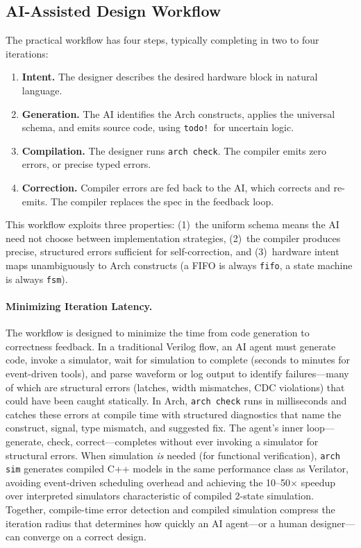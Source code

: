 \documentclass[11pt,twocolumn]{article}
\begin{document}
\subsection{AI-Assisted Design Workflow}

The practical workflow has four steps, typically completing in two to four iterations:

\begin{enumerate}
\item \textbf{Intent.} The designer describes the desired hardware block in natural language.
\item \textbf{Generation.} The AI identifies the Arch constructs, applies the universal schema, and emits source code, using \texttt{todo!}\ for uncertain logic.
\item \textbf{Compilation.} The designer runs \texttt{arch check}. The compiler emits zero errors, or precise typed errors.
\item \textbf{Correction.} Compiler errors are fed back to the AI, which corrects and re-emits. The compiler replaces the spec in the feedback loop.
\end{enumerate}

This workflow exploits three properties: (1)~the uniform schema means the AI need not choose between implementation strategies, (2)~the compiler produces precise, structured errors sufficient for self-correction, and (3)~hardware intent maps unambiguously to Arch constructs (a FIFO is always \texttt{fifo}, a state machine is always \texttt{fsm}).

\paragraph{Minimizing Iteration Latency.}
The workflow is designed to minimize the time from code generation to correctness feedback. In a traditional Verilog flow, an AI agent must generate code, invoke a simulator, wait for simulation to complete (seconds to minutes for event-driven tools), and parse waveform or log output to identify failures---many of which are structural errors (latches, width mismatches, CDC violations) that could have been caught statically. In Arch, \texttt{arch check} runs in milliseconds and catches these errors at compile time with structured diagnostics that name the construct, signal, type mismatch, and suggested fix. The agent's inner loop---generate, check, correct---completes without ever invoking a simulator for structural errors. When simulation \emph{is} needed (for functional verification), \texttt{arch sim} generates compiled C++ models in the same performance class as Verilator, avoiding event-driven scheduling overhead and achieving the 10--50$\times$ speedup over interpreted simulators characteristic of compiled 2-state simulation. Together, compile-time error detection and compiled simulation compress the iteration radius that determines how quickly an AI agent---or a human designer---can converge on a correct design.
\end{document}
